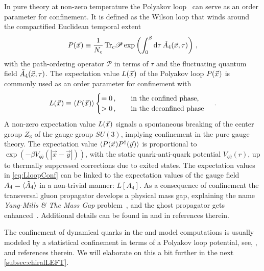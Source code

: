 In pure \ym{} theory at non-zero temperature the Polyakov loop~\cite{Polyakov:1975rs} can serve as an order parameter for confinement.
It is defined as the Wilson loop that winds around the compactified Euclidean temporal extent
\begin{align}
	P(\vec{x}\vts)\equiv \frac{1}{N_c}\Tr_c\!\mathscr{P}\exp\del[3]{\int_0^\beta\dif\tau\,\FSff{A}_4(\vec{x},\tau)}\,,
	\label{eq:Ploop}
\end{align}
with the path-ordering operator $\mathscr{P}$ in terms of $\tau$ and the fluctuating quantum field $\tilde{A}_4(\vec{x},\tau)$.
The expectation value $L(\vec{x}\mskip1.0mu)$ of the Polyakov loop  $P(\vec{x}\mskip1.0mu)$ is commonly used as an order parameter for confinement with
\begin{align}
	L(\vec{x}\mskip1.0mu) \equiv \langle P(\vec{x}\mskip1.0mu) \rangle \begin{cases}
	=0\,,\qquad \text{in the confined phase,}\\
	>0\,,\qquad \text{in the deconfined phase} 
	\end{cases}\,.
\label{eq:LloopConf}
\end{align}
A non-zero expectation value $L(\vec{x}\mskip1.0mu)$ signals a spontaneous breaking of the center group $Z_3$ of the gauge group $SU(3)$, implying confinement in the pure \ym{} gauge theory.
The expectation value $\langle P(\vec{x}\mskip1.0mu) P^\dagger(\vec{y}\mskip1.0mu)\rangle$ is proportional to $\exp(-\beta V_{q\bar{q}}(|\vec{x}-\vec{y}|))$, with the static quark-anti-quark potential $V_{q\bar{q}}(r)$, up to thermally suppressed corrections due to exited states.
The expectation values in \cref{eq:LloopConf} can be linked to the expectation values of the gauge field $A_4=\langle\tilde{A}_4\rangle$ in a non-trivial manner: $L[A_4]$.
As a consequence of confinement the transversal gluon propagator develops a physical mass gap, explaining the name \textit{Yang-Mills \& The Mass Gap} problem~\cite{YMMilleniumProblem},
and the ghost propagator gets enhanced~\cite{Gribov:1977wm,Kugo1979Feb,Zwanziger:2003cf}.
Additional details can be found in  and in references therein.

The confinement of dynamical quarks in the \frg{} and model computations is usually modeled by a statistical confinement in terms of a Polyakov loop potential, see, \eg{},  and references therein.
We will elaborate on this a bit further in the next \cref{subsec:chiralLEFT}.

